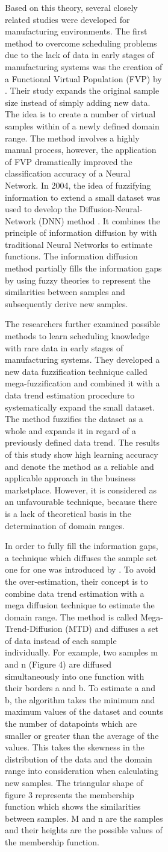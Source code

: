 \documentclass[parskip=full]{scrartcl}
\begin{document}
\begin{figure}[h]
\begin{figure}[h]
\begin{figure}[h]
Based on this theory, several closely related studies were developed for manufacturing environments. The first method to overcome scheduling problems due to the lack of data in early stages of manufacturing systems was the creation of a Functional Virtual Population (FVP) by \cite{Li.2003}.  Their study expands the original sample size instead of simply adding new data. The idea is to create a number of virtual samples within of a newly defined domain range. The method involves a highly manual process, however, the application of FVP dramatically improved the classification accuracy of a Neural Network. 
In 2004, the idea of fuzzifying information to extend a small dataset was used to develop the Diffusion-Neural-Network (DNN) method \cite{Huang.2004}. It combines the principle of information diffusion by \cite{Huang.1997} with traditional Neural Networks to estimate functions. The information diffusion method partially fills the information gaps by using fuzzy theories to represent the similarities between samples and subsequently derive new samples. 

The researchers \cite{Li.2006b} further examined possible methods to learn scheduling knowledge with rare data in early stages of manufacturing systems. They developed a new data fuzzification technique called mega-fuzzification and combined it with a data trend estimation procedure to systematically expand the small dataset. The method fuzzifies the dataset as a whole and expands it in regard of a previously defined data trend. The results of this study show high learning accuracy and denote the method as a reliable and applicable approach in the business marketplace. However, it is considered as an unfavourable technique, because there is a lack of theoretical basis in the determination of domain ranges. 

In order to fully fill the information gaps, a technique which diffuses the sample set one for one was introduced by \cite{Li.2007}. To avoid the over-estimation, their concept is to combine data trend estimation with a mega diffusion technique to estimate the domain range. The method is called Mega-Trend-Diffusion (MTD) and diffuses a set of data instead of each sample individually. For example, two samples m and n (Figure 4) are diffused simultaneously into one function with their borders a and b. To estimate a and b, the algorithm takes the minimum and maximum values of the dataset and counts the number of datapoints which are smaller or greater than the average of the values. This takes the skewness in the distribution of the data and the domain range into consideration when calculating new samples. The triangular shape of figure 3 represents the membership function which shows the similarities between samples. M and n are the samples and their heights are the possible values of the membership function.


\end{figure}
\end{figure}
\end{figure}
\end{document}
